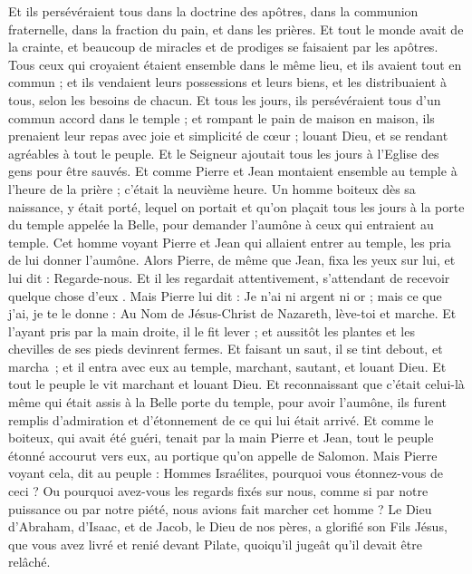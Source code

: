 \begin{multicols}{2}
Et ils persévéraient tous dans la doctrine des apôtres, dans la communion fraternelle, dans la fraction du pain, et dans les prières.
Et tout le monde avait de la crainte, et beaucoup de miracles et de prodiges se faisaient par les apôtres.
Tous ceux qui croyaient étaient ensemble dans le même lieu, et ils avaient tout en commun ;
et ils vendaient leurs possessions et leurs biens, et les distribuaient à tous, selon les besoins de chacun.
Et tous les jours, ils persévéraient tous d'un commun accord dans le temple ; et rompant le pain de maison en maison, ils prenaient leur repas avec joie et simplicité de cœur ;
louant Dieu, et se rendant agréables à tout le peuple. Et le Seigneur ajoutait tous les jours à l'Eglise des gens pour être sauvés.
\VerseOne{}Et comme Pierre et Jean montaient ensemble au temple à l'heure de la prière ; c’était la neuvième heure.
Un homme boiteux dès sa naissance, y était porté, lequel on portait et qu’on plaçait tous les jours à la porte du temple appelée la Belle, pour demander l'aumône à ceux qui entraient au temple.
Cet homme voyant Pierre et Jean qui allaient entrer au temple, les pria de lui donner l'aumône.
Alors Pierre, de même que Jean, fixa les yeux sur lui, et lui dit : Regarde-nous.
Et il les regardait attentivement, s'attendant de recevoir quelque chose d'eux .
Mais Pierre lui dit : Je n'ai ni argent ni or ; mais ce que j'ai, je te le donne : Au Nom de Jésus-Christ de Nazareth, lève-toi et marche.
Et l'ayant pris par la main droite, il le fit lever ; et aussitôt les plantes et les chevilles de ses pieds devinrent fermes.
Et faisant un saut, il se tint debout, et marcha ; et il entra avec eux au temple, marchant, sautant, et louant Dieu.
Et tout le peuple le vit marchant et louant Dieu.
Et reconnaissant que c’était celui-là même qui était assis à la Belle porte du temple, pour avoir l’aumône, ils furent remplis d’admiration et d’étonnement de ce qui lui était arrivé.
Et comme le boiteux, qui avait été guéri, tenait par la main Pierre et Jean, tout le peuple étonné accourut vers eux, au portique qu'on appelle de Salomon.
Mais Pierre voyant cela, dit au peuple : Hommes Israélites, pourquoi vous étonnez-vous de ceci ? Ou pourquoi avez-vous les regards fixés sur nous, comme si par notre puissance ou par notre piété, nous avions fait marcher cet homme ?
Le Dieu d'Abraham, d'Isaac, et de Jacob, le Dieu de nos pères, a glorifié son Fils Jésus, que vous avez livré et renié devant Pilate, quoiqu’il jugeât qu’il devait être relâché.

\end{multicols}
